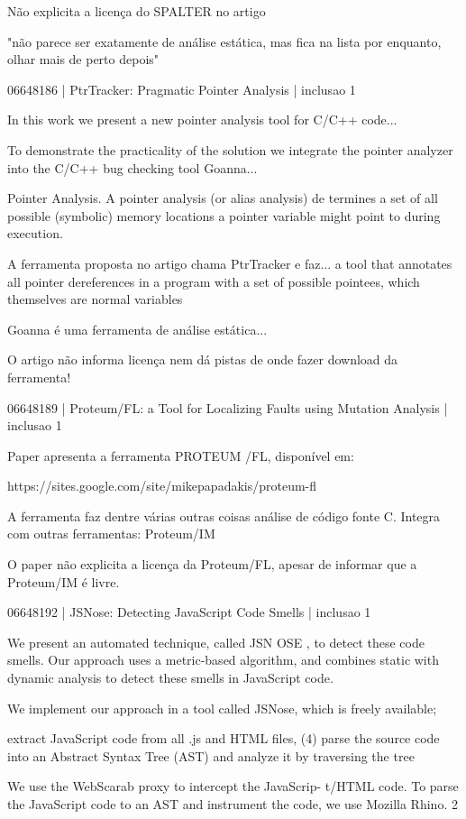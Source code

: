 \documentclass[12pt]{article}
\begin{document}
Não explicita a licença do SPALTER no artigo

"não parece ser exatamente de análise estática, mas fica na lista por
enquanto, olhar mais de perto depois"

06648186 | PtrTracker: Pragmatic Pointer Analysis | inclusao 1

In this work we present a new pointer analysis tool for C/C++ code...

To demonstrate the practicality of the solution we integrate the pointer
analyzer into the C/C++ bug checking tool Goanna...

Pointer Analysis. A pointer analysis (or alias analysis) de
termines a set of all possible (symbolic) memory locations a
pointer variable might point to during execution.

A ferramenta proposta no artigo chama PtrTracker e faz... a
tool that annotates all pointer dereferences in a program with a set of
possible pointees, which themselves are normal variables

Goanna é uma ferramenta de análise estática...

O artigo não informa licença nem dá pistas de onde fazer download da
ferramenta!

06648189 | Proteum/FL: a Tool for Localizing Faults using Mutation Analysis | inclusao 1

Paper apresenta a ferramenta PROTEUM /FL, disponível em:

https://sites.google.com/site/mikepapadakis/proteum-fl

A ferramenta faz dentre várias outras coisas análise de código fonte C.
Integra com outras ferramentas: Proteum/IM

O paper não explicita a licença da Proteum/FL, apesar de informar que a
Proteum/IM é livre.

06648192 | JSNose: Detecting JavaScript Code Smells | inclusao 1

We present an automated
technique, called JSN OSE , to detect these code smells. Our
approach uses a metric-based algorithm, and combines static
with dynamic analysis to detect these smells in JavaScript
code.

We implement our approach in a tool called JSNose,
which is freely available;

extract JavaScript code from all .js and HTML
files, (4) parse the source code into an Abstract Syntax Tree
(AST) and analyze it by traversing the tree

We use the WebScarab proxy to intercept the JavaScrip-
t/HTML code. To parse the JavaScript code to an AST and
instrument the code, we use Mozilla Rhino. 2
\end{document}
